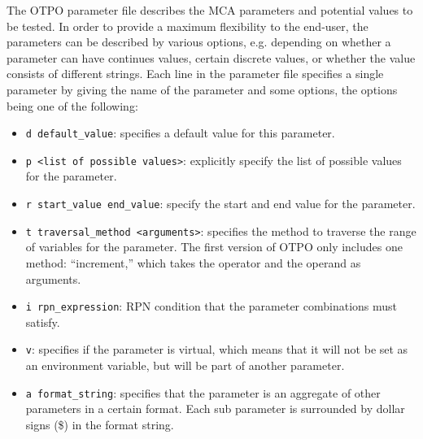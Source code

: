 The OTPO parameter file describes the MCA parameters and potential
values to be tested. In order to provide a maximum flexibility to the
end-user, the parameters can be described by various options,
e.g. depending on whether a parameter can have continues values,
certain discrete values, or whether the value consists of different
strings. Each line in the parameter file specifies a single parameter
by giving the name of the parameter and some options, the options
being one of the following:
\begin{itemize}
\item {\tt d default\_\-value}: specifies a default value for this
  parameter.
\item {\tt p <list of possible values>}: explicitly specify the list
  of possible values for the parameter.
\item {\tt r start\_\-value end\_\-value}: specify the start and end
  value for the parameter.
\item {\tt t traversal\_\-method <arguments>}: specifies the method to
  traverse the range of variables for the parameter. The first version
  of OTPO only includes one method: ``increment,'' which takes the
  operator and the operand as arguments.
\item {\tt i rpn\_\-expression}: RPN 
  condition that the parameter combinations must satisfy.
\item {\tt v}: specifies if the parameter is virtual, which means that
  it will not be set as an environment variable, but will be part of
  another parameter.
\item {\tt a format\_\-string}: specifies that the parameter is an
  aggregate of other parameters in a certain format. Each sub
  parameter is surrounded by dollar signs (\$) in the format string.
\end{itemize}

